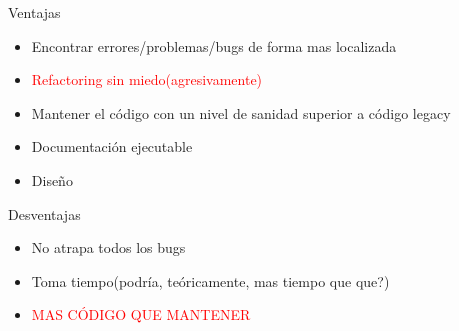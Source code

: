 \begin{frame}{Ventajas}
    \begin{itemize}
        \item Encontrar errores/problemas/bugs de forma mas localizada
        \item \textcolor{red}{Refactoring sin miedo(agresivamente)}
        \item Mantener el código con un nivel de sanidad superior a código legacy
        \item Documentación ejecutable
        \item Diseño
    \end{itemize}
\end{frame}

\begin{frame}{Desventajas}
    \begin{itemize}
        \item No atrapa todos los bugs
        \item Toma tiempo(podría, teóricamente, mas tiempo que que?)
        \item \textcolor{red}{MAS CÓDIGO QUE MANTENER}
    \end{itemize}
\end{frame}


